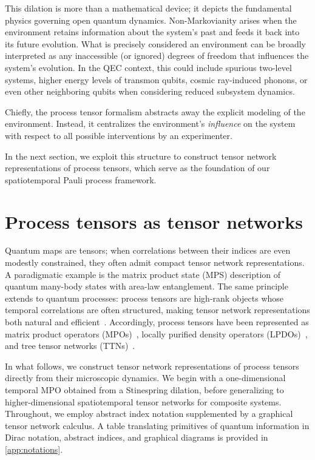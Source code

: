 \documentclass[
    aps,
    prx,
    reprint,
    superscriptaddress,
    longbibliography,
    nofootinbib,
    floatfix,
]{revtex4-2}
\begin{document}
This dilation is more than a mathematical device; it depicts the fundamental physics governing open quantum dynamics. Non-Markovianity arises when the environment retains information about the system’s past and feeds it back into its future evolution. What is precisely considered an environment can be broadly interpreted as any inaccessible (or ignored) degrees of freedom that influences the system's evolution. In the QEC context, this could include spurious two-level systems, higher energy levels of transmon qubits, cosmic ray-induced phonons, or even other neighboring qubits when considering reduced subsystem dynamics.

Chiefly, the process tensor formalism abstracts away the explicit modeling of the environment. Instead, it centralizes the environment's \emph{influence} on the system with respect to all possible interventions by an experimenter.

In the next section, we exploit this structure to construct tensor network representations of process tensors, which serve as the foundation of our spatiotemporal Pauli process framework.

\section{Process tensors as tensor networks}\label{sec:pt-tn}
Quantum maps are tensors; when correlations between their indices are even modestly constrained, they often admit compact tensor network representations. A paradigmatic example is the matrix product state (MPS) description of quantum many-body states with area-law entanglement. The same principle extends to quantum processes: process tensors are high-rank objects whose temporal correlations are often structured, making tensor network representations both natural and efficient~\cite{keelingProcessTensorApproaches2025}. Accordingly, process tensors have been represented as matrix product operators (MPOs)~\cite{pollockNonMarkovianQuantumProcesses2018,cygorekUnderstandingUtilizingInner2025}, locally purified density operators (LPDOs)~\cite{whiteUnifyingNonMarkovianCharacterization2025}, and tree tensor networks (TTNs)~\cite{dowlingCapturingLongRangeMemory2024}.

In what follows, we construct tensor network representations of process tensors directly from their microscopic dynamics. We begin with a one-dimensional temporal MPO obtained from a Stinespring dilation, before generalizing to higher-dimensional spatiotemporal tensor networks for composite systems. Throughout, we employ abstract index notation supplemented by a graphical tensor network calculus. A table translating primitives of quantum information in Dirac notation, abstract indices, and graphical diagrams is provided in \cref{app:notations}.
\end{document}
